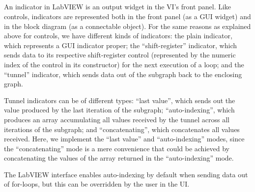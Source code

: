 \begin{hscode}\SaveRestoreHook
{}%
%
%
%
%
%
\>[B]{}\;\<[17]%
\>[17]{}\mathrel{=}{}\<[17E]%
\>[20]{}\;\<[E]%
\\
\>[17]{}\mid {}\<[17E]%
\>[20]{}\<[E]%
\\
\>[17]{}\mid {}\<[17E]%
\>[20]{}\<[E]%
\\
\>[17]{}\mid {}\<[17E]%
\>[20]{}\;\<[E]%
\\
\>[B]{}\<[4]%
\>[4]{}\;\<[E]%
\ColumnHook
\end{hscode}\resethooks

An indicator in LabVIEW is an output widget in the VI's front panel. Like
controls, indicators are represented both in the front panel (as a GUI widget)
and in the block diagram (as a connectable object). For the same reasons as
explained above for controls, we have different kinds of indicators: the plain
indicator, which represents a GUI indicator proper; the ``shift-register''
indicator, which sends data to its respective shift-register control (represented
by the numeric index of the control in its constructor) for the next execution
of a loop; and the ``tunnel'' indicator, which sends data out of the subgraph back
to the enclosing graph.

Tunnel indicators can be of different types: ``last value'', which sends out the
value produced by the last iteration of the subgraph; ``auto-indexing'', which
produces an array accumulating all values received by the tunnel across all
iterations of the subgraph; and ``concatenating'', which concatenates all
values received. Here, we implement the ``last value'' and ``auto-indexing''
modes, since the ``concatenating'' mode is a mere convenience that could be
achieved by concatenating the values of the array returned in the
``auto-indexing'' mode.

The LabVIEW interface enables auto-indexing by default when sending data
out of for-loops, but this can be overridden by the user in the UI.

